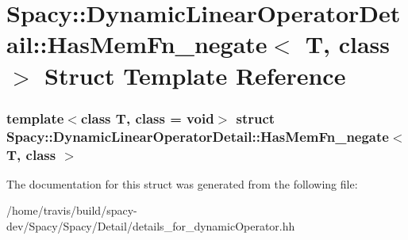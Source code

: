 \hypertarget{structSpacy_1_1DynamicLinearOperatorDetail_1_1HasMemFn__negate}{\section{\-Spacy\-:\-:\-Dynamic\-Linear\-Operator\-Detail\-:\-:\-Has\-Mem\-Fn\-\_\-negate$<$ \-T, class $>$ \-Struct \-Template \-Reference}
\label{structSpacy_1_1DynamicLinearOperatorDetail_1_1HasMemFn__negate}
}
\subsubsection*{template$<$class T, class = void$>$ struct Spacy\-::\-Dynamic\-Linear\-Operator\-Detail\-::\-Has\-Mem\-Fn\-\_\-negate$<$ T, class $>$}



\-The documentation for this struct was generated from the following file\-:\begin{DoxyCompactItemize}
\item 
/home/travis/build/spacy-\/dev/\-Spacy/\-Spacy/\-Detail/details\-\_\-for\-\_\-dynamic\-Operator.\-hh\end{DoxyCompactItemize}
